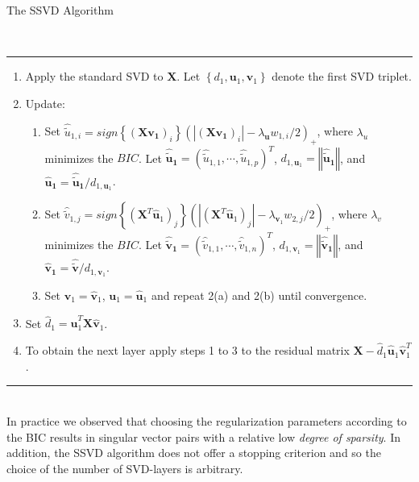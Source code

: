\begin{bf}The SSVD Algorithm\end{bf}\\
\hspace{-0.1cm} 
\rule{14.75 cm}{1pt}
\begin{enumerate}
 \item Apply the standard SVD to $\mathbf{X}$. Let $\left\{ d_{1}, \mathbf{u}_{1}, \mathbf{v}_{1} \right\}$ denote the first SVD triplet.
 \item Update:
  \begin{enumerate}
   \item Set $\hat{\tilde{u}}_{1,i}=\textit{sign}\left\{(\mathbf{X}\mathbf{v_{1}})_{i}\right\}(|(\mathbf{X}\mathbf{v_{1}})_{i}|-\lambda_{\mathbf{u}}w_{1,i}/2)_{+}$, 		      where $\lambda_{u}$ minimizes the $\textit{BIC}$. 
         Let $\mathbf{\hat{\tilde{u}}_{1}}=(\hat{\tilde{u}}_{1,1},\cdots,\hat{\tilde{u}}_{1,p})^{T}$,
	 $d_{1,\mathbf{u}_{1}}=\left\Vert \mathbf{\hat{\tilde{u}}_{1}} \right\Vert$, 
	 and $\mathbf{\hat{u}_{1}} = \mathbf{\hat{\tilde{u}}_{1}}/d_{1,\mathbf{u}_{1}}$.
   \item Set $\hat{\tilde{v}}_{1,j}=\textit{sign}\left\{(\mathbf{X}^{T}\mathbf{\hat{u}}_{1})_{j}\right\}(|(\mathbf{X}^{T}\mathbf{\hat{u}}_{1})_{j}|-\lambda_{\mathbf{v}_{1}}w_{2,j}/2)_{+}$, where
	 $\lambda_{v}$ minimizes the $\textit{BIC}$. 
         Let $\mathbf{\hat{\tilde{v}}_{1}}=(\hat{\tilde{v}}_{1,1},\cdots,\hat{\tilde{v}}_{1,n})^{T}$,
	 $d_{1,\mathbf{v}_{1}}=\left\Vert \mathbf{\hat{\tilde{v}}_{1}} \right\Vert$, 
	 and $\mathbf{\hat{v}_{1}} =\mathbf{\hat{\tilde{v}}}/d_{1,\mathbf{v}_{1}}$.
   \item Set $\mathbf{v}_{1}=\mathbf{\hat{v}}_{1}$, $\mathbf{u}_{1}=\mathbf{\hat{u}}_{1}$ and repeat 2(a) and 2(b) until convergence.
  \end{enumerate} 
 \item Set $\hat{d}_{1}=\mathbf{\hat{u}}_{1}^{T}\mathbf{X}\mathbf{\hat{v}}_{1}$.
 \item To obtain the next layer apply steps 1 to 3 to the residual matrix $\mathbf{X}-\hat{d}_{1}\mathbf{\hat{u}}_{1}\mathbf{\hat{v}}_{1}^{T}$.
\end{enumerate}
\hspace{-0.1cm} 
\rule{14.75 cm}{1pt}\\
In practice we observed that choosing the regularization parameters according to the BIC results in singular vector pairs with a relative low \textit{degree of sparsity}. In addition, the SSVD algorithm does not offer a stopping criterion and so the choice of the number of SVD-layers is arbitrary.

